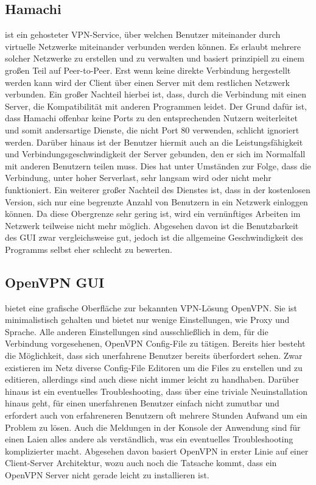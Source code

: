 \documentclass[a4paper,12pt]{scrreprt}
\begin{document}
	\subsection{Hamachi} ist ein gehosteter VPN-Service, über welchen Benutzer miteinander durch virtuelle Netzwerke miteinander verbunden werden können. Es erlaubt mehrere solcher Netzwerke zu erstellen und zu verwalten und basiert prinzipiell zu einem großen Teil auf Peer-to-Peer. Erst wenn keine direkte Verbindung hergestellt werden kann wird der Client über einen Server mit dem restlichen Netzwerk verbunden. Ein großer Nachteil hierbei ist, dass, durch die Verbindung mit einen Server, die Kompatibilität mit anderen Programmen leidet. Der Grund dafür ist, dass Hamachi offenbar keine Ports zu den entsprechenden Nutzern weiterleitet und somit andersartige Dienste, die nicht Port 80 verwenden, schlicht ignoriert werden. Darüber hinaus ist der Benutzer hiermit auch an die Leistungsfähigkeit und Verbindungsgeschwindigkeit der Server gebunden, den er sich im Normalfall mit anderen Benutzern teilen muss. Dies hat unter Umständen zur Folge, dass die Verbindung, unter hoher Serverlast, sehr langsam wird oder nicht mehr funktioniert. Ein weiterer großer Nachteil des Dienstes ist, dass in der kostenlosen Version, sich nur eine begrenzte Anzahl von Benutzern in ein Netzwerk einloggen können. Da diese Obergrenze sehr gering ist, wird ein vernünftiges Arbeiten im Netzwerk teilweise nicht mehr möglich. Abgesehen davon ist die Benutzbarkeit des GUI zwar vergleichsweise gut, jedoch ist die allgemeine Geschwindigkeit des Programms selbst eher schlecht zu bewerten. 
	
	\subsection{OpenVPN GUI} bietet eine grafische Oberfläche zur bekannten VPN-Lösung OpenVPN. Sie ist minimalistisch gehalten und bietet nur wenige Einstellungen, wie Proxy und Sprache. Alle anderen Einstellungen sind ausschließlich in dem, für die Verbindung vorgesehenen, OpenVPN Config-File zu tätigen. Bereits hier besteht die Möglichkeit, dass sich unerfahrene Benutzer bereits überfordert sehen. Zwar existieren im Netz diverse Config-File Editoren um die Files zu erstellen und zu editieren, allerdings sind auch diese nicht immer leicht zu handhaben. Darüber hinaus ist ein eventuelles Troubleshooting, dass über eine triviale Neuinstallation hinaus geht, für einen unerfahrenen Benutzer einfach nicht zumutbar und erfordert auch von erfahreneren Benutzern oft mehrere Stunden Aufwand um ein Problem zu lösen. Auch die Meldungen in der Konsole der Anwendung sind für einen Laien alles andere als verständlich, was ein eventuelles Troubleshooting komplizierter macht. Abgesehen davon basiert OpenVPN in erster Linie auf einer Client-Server Architektur, wozu auch noch die Tatsache kommt, dass ein OpenVPN Server nicht gerade leicht zu installieren ist.
	
\end{document}
